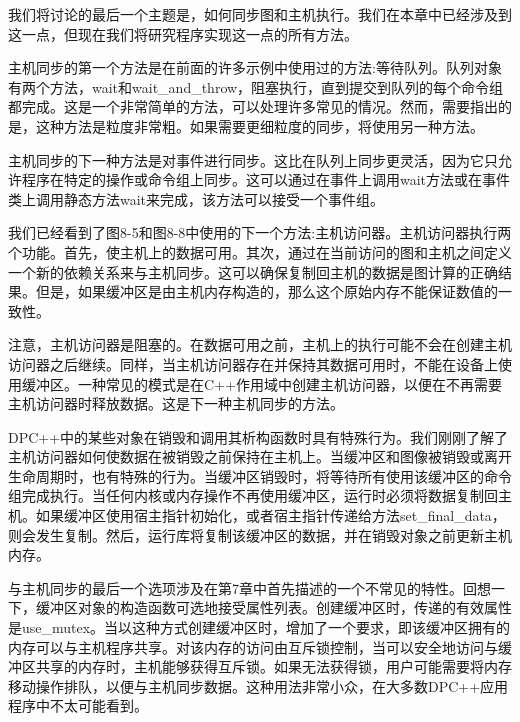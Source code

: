 我们将讨论的最后一个主题是，如何同步图和主机执行。我们在本章中已经涉及到这一点，但现在我们将研究程序实现这一点的所有方法。\par

主机同步的第一个方法是在前面的许多示例中使用过的方法:等待队列。队列对象有两个方法，wait和wait\_and\_throw，阻塞执行，直到提交到队列的每个命令组都完成。这是一个非常简单的方法，可以处理许多常见的情况。然而，需要指出的是，这种方法是粒度非常粗。如果需要更细粒度的同步，将使用另一种方法。\par

主机同步的下一种方法是对事件进行同步。这比在队列上同步更灵活，因为它只允许程序在特定的操作或命令组上同步。这可以通过在事件上调用wait方法或在事件类上调用静态方法wait来完成，该方法可以接受一个事件组。\par

我们已经看到了图8-5和图8-8中使用的下一个方法:主机访问器。主机访问器执行两个功能。首先，使主机上的数据可用。其次，通过在当前访问的图和主机之间定义一个新的依赖关系来与主机同步。这可以确保复制回主机的数据是图计算的正确结果。但是，如果缓冲区是由主机内存构造的，那么这个原始内存不能保证数值的一致性。\par

注意，主机访问器是阻塞的。在数据可用之前，主机上的执行可能不会在创建主机访问器之后继续。同样，当主机访问器存在并保持其数据可用时，不能在设备上使用缓冲区。一种常见的模式是在C++作用域中创建主机访问器，以便在不再需要主机访问器时释放数据。这是下一种主机同步的方法。\par

DPC++中的某些对象在销毁和调用其析构函数时具有特殊行为。我们刚刚了解了主机访问器如何使数据在被销毁之前保持在主机上。当缓冲区和图像被销毁或离开生命周期时，也有特殊的行为。当缓冲区销毁时，将等待所有使用该缓冲区的命令组完成执行。当任何内核或内存操作不再使用缓冲区，运行时必须将数据复制回主机。如果缓冲区使用宿主指针初始化，或者宿主指针传递给方法set\_final\_data，则会发生复制。然后，运行库将复制该缓冲区的数据，并在销毁对象之前更新主机内存。\par

与主机同步的最后一个选项涉及在第7章中首先描述的一个不常见的特性。回想一下，缓冲区对象的构造函数可选地接受属性列表。创建缓冲区时，传递的有效属性是use\_mutex。当以这种方式创建缓冲区时，增加了一个要求，即该缓冲区拥有的内存可以与主机程序共享。对该内存的访问由互斥锁控制，当可以安全地访问与缓冲区共享的内存时，主机能够获得互斥锁。如果无法获得锁，用户可能需要将内存移动操作排队，以便与主机同步数据。这种用法非常小众，在大多数DPC++应用程序中不太可能看到。\par

